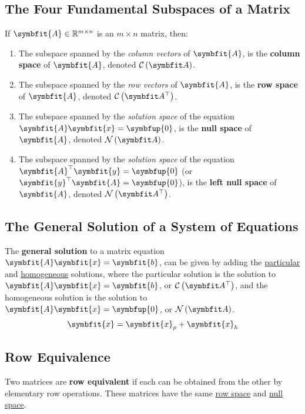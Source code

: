 \documentclass{article}
\begin{document}
\subsection{The Four Fundamental Subspaces of a Matrix}
\begin{definition}
    If \(\symbfit{A}\in\mathbb{R}^{m \times n}\) is an \(m \times n\) matrix, then:
    \begin{enumerate}
        \item The subspace spanned by the \textit{column vectors} of
              \(\symbfit{A}\), is the \textbf{column space} of
              \(\symbfit{A}\), denoted \(\columnspace{A}\).
        \item The subspace spanned by the \textit{row vectors} of
              \(\symbfit{A}\), is the \textbf{row space} of \(\symbfit{A}\),
              denoted \(\rowspace{A}\).
        \item The subspace spanned by the \textit{solution space} of the
              equation \(\symbfit{A}\symbfit{x}=\symbfup{0}\), is the
              \textbf{null space} of \(\symbfit{A}\), denoted
              \(\nullspace{A}\).
        \item The subspace spanned by the \textit{solution space} of the
              equation \(\symbfit{A}^{\top}\symbfit{y}=\symbfup{0}\)
              (or \(\symbfit{y}^{\top}\symbfit{A}=\symbfup{0}\)), is the
              \textbf{left null space} of \(\symbfit{A}\), denoted
              \(\leftnullspace{A}\).
    \end{enumerate}
\end{definition}
\subsection{The General Solution of a System of Equations}
\begin{theorem}
    The \textbf{general solution} to a matrix equation
    \(\symbfit{A}\symbfit{x}=\symbfit{b}\), can be given by adding the
    \underline{particular} and \underline{homogeneous} solutions, where
    the particular solution is the solution to
    \(\symbfit{A}\symbfit{x}=\symbfit{b}\), or \(\rowspace{A}\), and the
    homogeneous solution is the solution to
    \(\symbfit{A}\symbfit{x}=\symbfup{0}\), or \(\nullspace{A}\).
    \begin{equation*}
        \symbfit{x} = \symbfit{x}_p + \symbfit{x}_h
    \end{equation*}
\end{theorem}
\subsection{Row Equivalence}
\begin{definition}
    Two matrices are \textbf{row equivalent} if each can be obtained
    from the other by elementary row operations. These matrices have the
    same \underline{row space} and \underline{null space}.
\end{definition}
\end{document}
